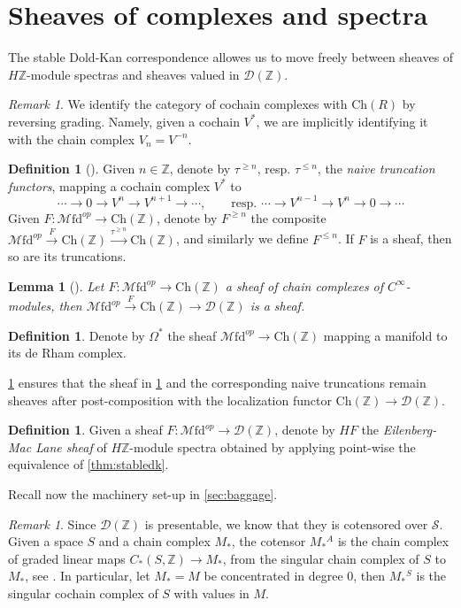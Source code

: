 \documentclass[10pt]{amsart}
\newcommand{\D}{\mathscr{D}}
\newcommand{\s}{\mathscr{S}}
\newcommand{\bZ}{\mathbb{Z}}
\newcommand{\Ch}{\mathrm{Ch}}
\newcommand{\Mfd}{\mathscr{M}\mathrm{fd}}
\newtheorem{lemma}[equation]{Lemma}
\theoremstyle{definition}
\newtheorem{definition}[equation]{Definition}
\theoremstyle{remark}
\newtheorem{remark}[equation]{Remark}
\numberwithin{equation}{section}
\begin{document}
\section{Sheaves of complexes and spectra}

The stable Dold-Kan correspondence allowes us to move freely between sheaves of $H\bZ$-module spectras and sheaves valued in $\D(\bZ)$.

\begin{remark}\label{rmk:identification}
  We identify the category of cochain complexes with $\Ch(R)$ by reversing grading. Namely, given a cochain $V^*$, we are implicitly identifying it with the chain complex $V_n=V^{-n}$. 
\end{remark}
\begin{definition}[{\cite[Definition 7.14]{bunkenikolausvoelkl2016diffcoh}}]Given $n\in\bZ$, denote by $\tau^{\geq n}$, resp. $\tau^{\leq n}$, the \emph{naive truncation functors}, mapping a cochain complex $V^*$ to \[\cdots\to0\to V^n\to V^{n+1}\to\cdots, \qquad \mbox{resp. }\cdots\to V^{n-1}\to V^n\to0\to\cdots\]Given $F:\Mfd^{op}\to\Ch(\bZ)$, denote by $F^{\geq n}$ the composite $\Mfd^{op}\xrightarrow{F}\Ch(\bZ)\xrightarrow{\tau^{\geq n}}\Ch(\bZ)$, and similarly we define $F^{\leq n}$. If $F$ is a sheaf, then so are its truncations. 
\end{definition}
\begin{lemma}[{\cite[Lemma 7.12]{bunkenikolausvoelkl2016diffcoh}}]\label{lem:sheafloc}
  Let $F:\Mfd^{op}\to\Ch(\bZ)$ a sheaf of chain complexes of $C^\infty$-modules, then $\Mfd^{op}\xrightarrow{F}\Ch(\bZ)\to\D(\bZ)$ is a sheaf. 
\end{lemma}
\begin{definition}\label{def:forms}
  Denote by $\Omega^*$ the sheaf $\Mfd^{op}\to\Ch(\bZ)$ mapping a manifold to its de Rham complex. 
\end{definition}
\cref{lem:sheafloc} ensures that the sheaf in \cref{def:forms} and the corresponding naive truncations remain sheaves after post-composition with the localization functor $\Ch(\bZ)\to\D(\bZ)$.  
\begin{definition}\label{def:EMsheaf}
  Given a sheaf $F:\Mfd^{op}\to\D(\bZ)$, denote by $HF$ the \emph{Eilenberg-Mac Lane sheaf} of $H\bZ$-module spectra obtained by applying point-wise the equivalence of \cref{thm:stabledk}. 
\end{definition}
Recall now the machinery set-up in \cref{sec:baggage}.
\begin{remark}\label{rmk:Dcotensor}
  Since $\D(\bZ)$ is presentable, we know that they is cotensored over $\s$. Given a space $S$ and a chain complex $M_*$, the cotensor $M_*{}^A$ is the chain complex of graded linear maps $C_*(S,\bZ)\to M_*$, from the singular chain complex of $S$ to $M_*$, see \cite[Definition 1.3.2.1]{lurie2017ha}. In particular, let $M_*=M$ be concentrated in degree 0, then $M_*{}^S$ is the singular cochain complex of $S$ with values in $M$.
\end{remark}
\end{document}
